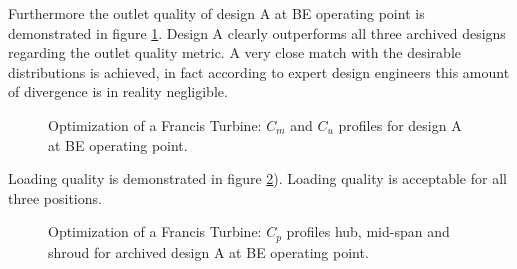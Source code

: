 Furthermore the outlet quality of design A at BE operating point is demonstrated in figure  \ref{Francis-A-OUT}. Design A clearly outperforms all three archived designs regarding the outlet quality metric. A very close match with the desirable distributions is achieved, in fact according to expert design engineers this amount of divergence is in reality negligible.

\begin{figure}[h!]
\begin{minipage}[b]{1\linewidth}
 \centering
\end{minipage}
\caption{Optimization of a Francis Turbine: $C_m$ and $C_u$ profiles for design A at BE operating point.}
\label{Francis-A-OUT}
\end{figure}

Loading quality is demonstrated in figure \ref{Francis-A-LOAD}). Loading quality is acceptable for all three positions. 

\begin{figure}[h!]
\begin{minipage}[b]{1\linewidth}
 \centering
\end{minipage}
\caption{Optimization of a Francis Turbine: $C_p$ profiles hub, mid-span and shroud for archived design A at BE operating point.}
\label{Francis-A-LOAD}
\end{figure} 

